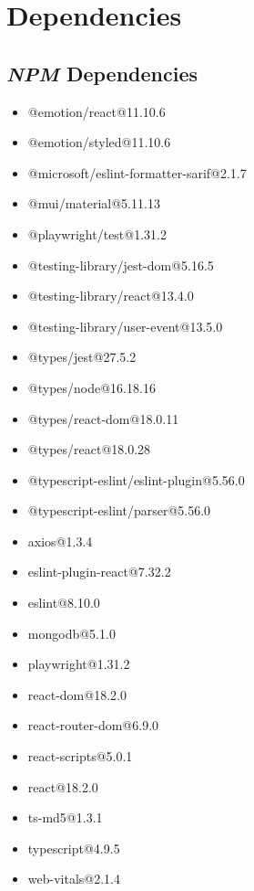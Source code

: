 
\appendix
\appendixpage

\chapter{Dependencies}

\section{\textit{NPM} Dependencies} \label{appendix:dependencies}
\begin{itemize}
    \item @emotion/react@11.10.6
    \item @emotion/styled@11.10.6
    \item @microsoft/eslint-formatter-sarif@2.1.7
    \item @mui/material@5.11.13
    \item @playwright/test@1.31.2
    \item @testing-library/jest-dom@5.16.5
    \item @testing-library/react@13.4.0
    \item @testing-library/user-event@13.5.0
    \item @types/jest@27.5.2
    \item @types/node@16.18.16 
    \item @types/react-dom@18.0.11
    \item @types/react@18.0.28
    \item @typescript-eslint/eslint-plugin@5.56.0
    \item @typescript-eslint/parser@5.56.0
    \item axios@1.3.4
    \item eslint-plugin-react@7.32.2
    \item eslint@8.10.0
    \item mongodb@5.1.0
    \item playwright@1.31.2
    \item react-dom@18.2.0
    \item react-router-dom@6.9.0
    \item react-scripts@5.0.1
    \item react@18.2.0
    \item ts-md5@1.3.1
    \item typescript@4.9.5
    \item web-vitals@2.1.4
\end{itemize} 

